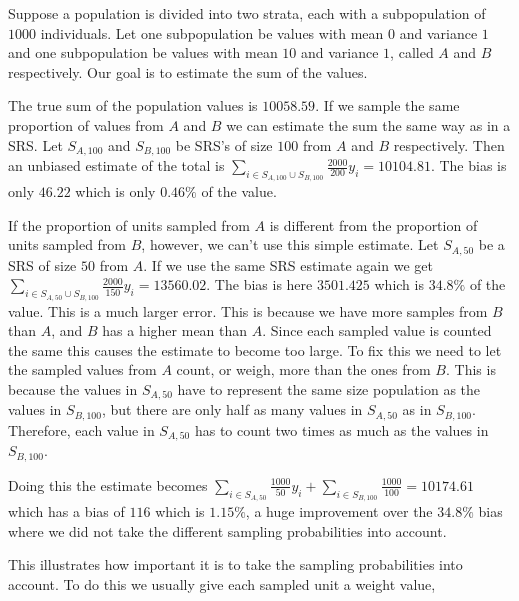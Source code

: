 \documentclass{article}
\begin{document}
\begin{example} \label{ex:uneqProbs}
  Suppose a population is divided into two strata, each with a subpopulation of
  \(1000\) individuals. Let one subpopulation be values with mean
  \(0\) and variance \(1\) and one subpopulation be values with mean \(10\) and variance \(1\), called
  \(A\) and \(B\) respectively.
  Our goal is to estimate the sum of the values.

  The true sum of the population values is \(10058.59\). If we sample the same
  proportion of values from \(A\) and \(B\) we can estimate the sum the same way
  as in a SRS. Let \(S_{A, 100}\) and
  \(S_{B, 100}\) be SRS's of size \(100\) from \(A\) and \(B\) respectively.
  Then an unbiased estimate of the total is \(\sum_{i \in S_{A, 100} \cup S_{B,
      100} } \frac{2000}{200} y_i = 10104.81\). The bias is only \(46.22\) which is only \(0.46\%\) of the
  value.

  If the proportion of units sampled from \(A\) is different from the
  proportion of units sampled from \(B\), however, we
  can't use this simple estimate. Let \(S_{A, 50}\) be a SRS of size \(50\)
  from \(A\). If we use the same SRS estimate again we get \(\sum_{i \in S_{A, 50} \cup S_{B,
      100}} \frac{2000}{150} y_i = 13560.02\). The bias is here \(3501.425\) which is \(34.8\%\) of the
  value. This is a much larger error. This is because we have more samples from
  \(B\) than \(A\), and \(B\) has a higher mean than \(A\). Since each sampled
  value is counted the same this causes the estimate to become too large. To fix
  this we need to let the sampled values from \(A\) count, or weigh, more than
  the ones from \(B\). This is because the values in \(S_{A, 50}\) have to
  represent the same size population as the values in \(S_{B, 100}\), but there
  are only half as many values in \(S_{A, 50}\) as in \(S_{B, 100}\). Therefore,
  each value in \(S_{A, 50}\) has to count two times as much as the values in \(S_{B, 100}\).

  Doing this the estimate becomes \(\sum_{i
    \in S_{A, 50}} \frac{1000}{50} y_i + \sum_{i \in S_{B, 100}}
  \frac{1000}{100} = 10174.61\) which has a bias of \(116\) which is \(1.15\%\),
  a huge improvement over the \(34.8\%\) bias where we did not take the
  different sampling probabilities into account.
\end{example}

This illustrates how important it is to take the sampling probabilities into
account. To do this we usually give each sampled unit a weight value,
\end{document}
